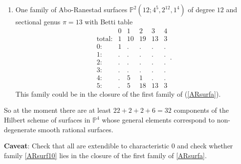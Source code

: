 \documentclass[twoside,12pt, leqno]{amsart}
\def\PP{{\mathbb P}}
\begin{document}
\begin{enumerate}
\item\label{ARsurf10} One family of Abo-Ranestad surfaces $\PP^{2}(12;4^{5},2^{12},1^{4})$ of degree $12$ and sectional genus $\pi=13$ with Betti table
$$
\begin{matrix}
       & 0 & 1 & 2 & 3 & 4\\
      \text{total:} & 1 & 10 & 19 & 13 & 3\\
      0: & 1 & . & . & . & .\\
      1: & . & . & . & . & .\\
      2: & . & . & . & . & .\\
      3: & . & . & . & . & .\\
      4: & . & 5 & 1 & . & .\\
      5: & . & 5 & 18 & 13 & 3
      \end{matrix}.$$
This family could be in the closure of the first family of (\ref{ARsurfa}).
\end{enumerate}

So at the moment there are at least $22+2+2+6=32$ components of the Hilbert scheme of surfaces in $\PP^{4}$ whose general elements correspond to non-degenerate  smooth rational surfaces.

{\bf Caveat}: Check that all are extendible to characteristic 0 and check whether family \ref{ARsurf10} lies in the closure of the first family of \ref{ARsurfa}.
\end{document}
